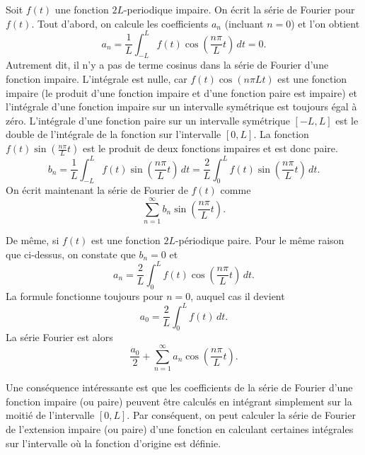 Soit $f(t)$ une fonction $2L$-periodique impaire.  On écrit
la série de Fourier pour $ f (t) $. Tout d'abord, on calcule les coefficients $a_n$ (incluant
$n=0$) et l'on obtient
\begin{equation*}
a_n = \frac{1}{L} \int_{-L}^L f(t) \cos \left( \frac{n \pi}{L} t \right)
\, dt = 0 .
\end{equation*}
Autrement dit, il n'y a pas de terme cosinus dans la série de Fourier d'une fonction impaire.
L'intégrale est nulle, car $f(t) \cos \left( {n \pi}{L} t \right)$
est une fonction impaire (le produit d'une fonction impaire et d'une
fonction paire est impaire) et l'intégrale d'une fonction impaire sur un intervalle symétrique est toujours égal à zéro. L'intégrale d'une fonction paire sur un intervalle symétrique
$[-L,L]$  est le double de l'intégrale de la fonction sur l'intervalle $[0,L]$.
La fonction $f(t) \sin \left( \frac{n \pi}{L} t \right)$ est le produit de deux fonctions impaires
et est donc paire.
\begin{equation*}
b_n = 
\frac{1}{L} \int_{-L}^L f(t) \sin \left( \frac{n \pi}{L} t \right) \, dt =
\frac{2}{L} \int_{0}^L f(t) \sin \left( \frac{n \pi}{L} t \right) \, dt .
\end{equation*}
On écrit maintenant la série de Fourier de $f(t)$ comme
\begin{equation*}
\sum_{n=1}^\infty b_n \sin \left( \frac{n \pi}{L} t \right) .
\end{equation*}

De même, si $f(t)$ est une fonction  $2L$-périodique paire.  Pour le même 
raison que ci-dessus, on constate que $b_n = 0$ et
\begin{equation*}
a_n = 
\frac{2}{L} \int_{0}^L f(t) \cos \left( \frac{n \pi}{L} t \right) \, dt .
\end{equation*}
La formule fonctionne toujours pour $n=0$, auquel cas il devient
\begin{equation*}
a_0 = 
\frac{2}{L} \int_{0}^L f(t) \, dt .
\end{equation*}
La série Fourier est alors
\begin{equation*}
\frac{a_0}{2}
+
\sum_{n=1}^\infty a_n \cos \left( \frac{n \pi}{L} t \right) .
\end{equation*}

Une conséquence intéressante est que les coefficients de la série de Fourier d'une fonction impaire (ou paire) peuvent être calculés en intégrant simplement sur la moitié de l'intervalle $[0,L]$.  Par conséquent, on peut calculer la série de Fourier de
l'extension impaire (ou paire) d'une fonction en calculant certaines intégrales sur l'intervalle
où la fonction d'origine est définie.


